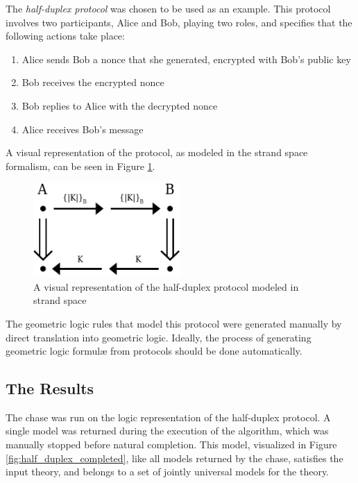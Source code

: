 		The \emph{half-duplex protocol} was chosen to be used as an example.
		This protocol involves two participants, Alice and Bob, playing two
		roles, and specifies that the following actions take place:

		\begin{enumerate}
		\item Alice sends Bob a nonce that she generated, encrypted with Bob's public key
		\item Bob receives the encrypted nonce
		\item Bob replies to Alice with the decrypted nonce
		\item Alice receives Bob's message
		\end{enumerate}

		A visual representation of the protocol, as modeled in the strand space
		formalism, can be seen in Figure \ref{fig:half_duplex}.

		\begin{figure}[h]
			\centering
			\includegraphics[width=0.5\textwidth]{half-duplex}
			\caption{
				A visual representation of the half-duplex protocol modeled in strand space
				\label{fig:half_duplex}
			}
		\end{figure}

		The geometric logic rules that model this protocol were generated
		manually by direct translation into geometric logic. Ideally, the
		process of generating geometric logic formul{\ae} from protocols should
		be done automatically.

	\subsection{The Results}

		The chase was run on the logic representation of the half-duplex protocol.
		A single model was returned during the execution of the algorithm,
		which was manually stopped before natural completion. This model,
		visualized in Figure \ref{fig:half_duplex_completed}, like all models
		returned by the chase, satisfies the input theory, and belongs to a set
		of jointly universal models for the theory.

